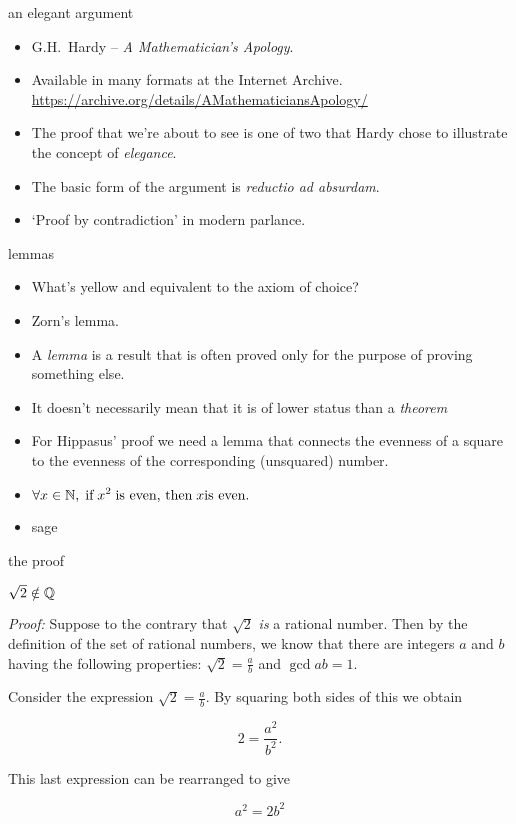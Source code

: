 \documentclass[landscape]{beamer}
\begin{document}
\begin{frame}{an elegant argument}
\begin{itemize}
\item G.H.\ Hardy -- {\em A Mathematician's Apology}. \pause
\item Available in many formats at the Internet Archive.\newline
\href{https://archive.org/details/AMathematiciansApology/}{https://archive.org/details/AMathematiciansApology/} \pause
\item The proof that we're about to see is one of two that Hardy chose to illustrate the concept of {\em elegance}. \pause
\item The basic form of the argument is {\em reductio ad absurdam}. \pause
\item `Proof by contradiction' in modern parlance.
\end{itemize}
\end{frame}

\begin{frame}{lemmas}
\begin{itemize}
\item What's yellow and equivalent to the axiom of choice? \pause
\item Zorn's lemma. \pause
\item A {\em lemma} is a result that is often proved only for the purpose of proving something else. \pause
\item It doesn't necessarily mean that it is of lower status than a {\em theorem}\textellipsis
\pause
\item For Hippasus' proof we need a lemma that connects the evenness of a square to the evenness of the corresponding (unsquared) number. \pause
\item $\displaystyle \forall x \in {\mathbb N}, \; \mbox{if} \; x^2 \; \mbox{is even, then} \; x \mbox{is even}.$ \pause
\item sage 
\end{itemize}
\end{frame}

\begin{frame}{the proof}

\begin{theorem}
$\sqrt{2} \notin {\mathbb Q}$
\end{theorem}

\emph{Proof:}
Suppose to the contrary that $\sqrt{2}$ {\em is} a rational number.
Then by the definition of the set of rational numbers, we know that
there are integers 
$a$ and $b$ having the following properties: 
$\displaystyle \sqrt{2} = \frac{a}{b}$ and $\gcd{a}{b} = 1$.  

Consider the expression $\displaystyle \sqrt{2} = \frac{a}{b}$.   
By squaring both sides of this we obtain

\[ 2 = \frac{a^2}{b^2}. \]

This last expression can be rearranged to give

\begin{equation*}
a^2 = 2 b^2
\end{equation*}
\end{frame}
\end{document}
